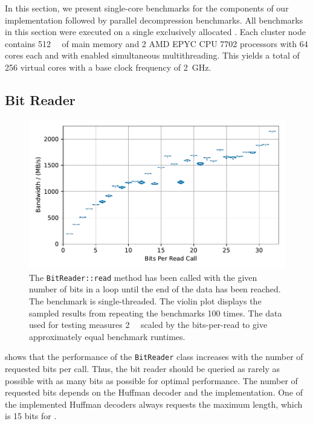 In this section, we present single-core benchmarks for the components of our implementation followed by parallel decompression benchmarks.
All benchmarks in this section were executed on a single exclusively allocated .
Each cluster node contains \SI{512}{\gibi\byte} of main memory and \num{2} AMD EPYC CPU 7702 processors with \num{64} cores each and with enabled simultaneous multithreading.
This yields a total of \num{256} virtual cores with a base clock frequency of \SI{2}{\giga\hertz}.

\subsection{Bit Reader}

\begin{figure}
    \centering
    \includegraphics[width=\linewidth]{plots/bitreader-bandwidths-over-bits-per-read.pdf}
    \caption{
        The \texttt{BitReader::read} method has been called with the given number of bits in a loop until the end of the data has been reached.
        The benchmark is single-threaded.
        The violin plot displays the sampled results from repeating the benchmarks 100 times.
        The data used for testing measures \SI{2}{\mebi\byte} scaled by the bits-per-read to give approximately equal benchmark runtimes.
    }
    \label{fig:bitreader}
\end{figure}

 shows that the performance of the \texttt{BitReader} class increases with the number of requested bits per call.
Thus, the bit reader should be queried as rarely as possible with as many bits as possible for optimal performance.
The number of requested bits depends on the Huffman decoder and the \blockfinder implementation.
One of the implemented Huffman decoders always requests the maximum \huffcode length, which is 15 bits for .

